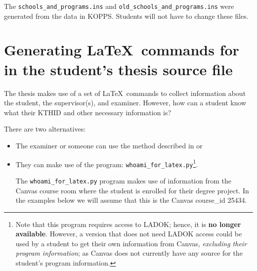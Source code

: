 The \texttt{schools\_and\_programs.ins} and \texttt{old\_schools\_and\_programs.ins} were generated from the data in KOPPS. Students will not have to change these files.
\clearpage


\section{Generating \LaTeX~commands for in the student’s thesis source file}
The thesis makes use of a set of \LaTeX~commands to collect information about the student, the supervisor(s), and examiner. However, how can a student know what their KTHID and other necessary information is?

There are two alternatives:
\begin{itemize}
    \item The examiner or someone can use the method described in  or

    \item They can make use of the program: \texttt{whoami\_for\_latex.py}\footnote{Note that this program requires access to LADOK; hence, it is \textbf{no longer available}. However, a version that does not need LADOK access could be used by a student to get their own information from Canvas, \textit{excluding their program information}; as Canvas does not currently have any source for the student's program information.}.
    
    The \texttt{whoami\_for\_latex.py} program makes use of information from the Canvas course room where the student is enrolled for their degree project. In the examples below we will assume that this is the Canvas course\_id 25434.
\end{itemize}

